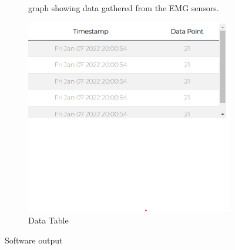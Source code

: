 \begin{figure}[h]
\begin{subfigure}[h]{0.45\textwidth}
         \caption{graph showing data gathered from the EMG sensors.}
         \label{fig:graph}
     \end{subfigure}
     \begin{subfigure}[h]{0.45\textwidth}
         \centering
         \includegraphics[width=\textwidth]{Progress_Report/figs/data_table.png}
         \caption{Data Table}
         \label{fig:table}
     \end{subfigure}     
        \caption{Software output}
        \label{fig:three graphs}
\end{figure}



